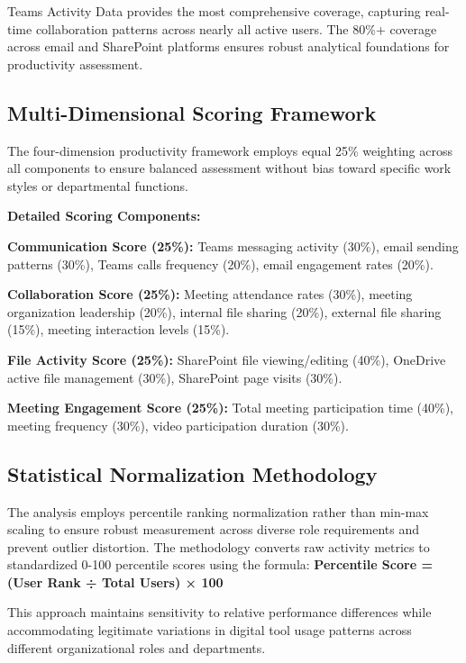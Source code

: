 \documentclass[12pt,a4paper]{article}
\begin{document}
Teams Activity Data provides the most comprehensive coverage, capturing real-time collaboration patterns across nearly all active users. The 80\%+ coverage across email and SharePoint platforms ensures robust analytical foundations for productivity assessment.

\subsection{Multi-Dimensional Scoring Framework}

The four-dimension productivity framework employs equal 25\% weighting across all components to ensure balanced assessment without bias toward specific work styles or departmental functions.

\begin{infobox}
\textbf{\faCog \quad Detailed Scoring Components:}

\textbf{Communication Score (25\%):} Teams messaging activity (30\%), email sending patterns (30\%), Teams calls frequency (20\%), email engagement rates (20\%).

\textbf{Collaboration Score (25\%):} Meeting attendance rates (30\%), meeting organization leadership (20\%), internal file sharing (20\%), external file sharing (15\%), meeting interaction levels (15\%).

\textbf{File Activity Score (25\%):} SharePoint file viewing/editing (40\%), OneDrive active file management (30\%), SharePoint page visits (30\%).

\textbf{Meeting Engagement Score (25\%):} Total meeting participation time (40\%), meeting frequency (30\%), video participation duration (30\%).
\end{infobox}

\subsection{Statistical Normalization Methodology}

The analysis employs percentile ranking normalization rather than min-max scaling to ensure robust measurement across diverse role requirements and prevent outlier distortion. The methodology converts raw activity metrics to standardized 0-100 percentile scores using the formula: \textbf{Percentile Score = (User Rank ÷ Total Users) × 100}

This approach maintains sensitivity to relative performance differences while accommodating legitimate variations in digital tool usage patterns across different organizational roles and departments.
\end{document}
